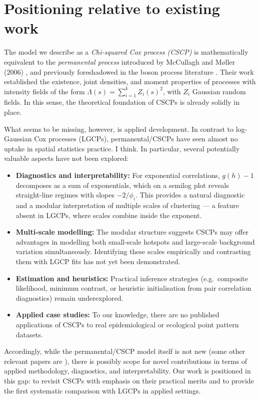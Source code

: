\documentclass[11pt]{article}
\begin{document}
\section*{Positioning relative to existing work}

The model we describe as a \emph{Chi-squared Cox process (CSCP)} is mathematically 
equivalent to the \emph{permanental process} introduced by McCullagh and M{\o}ller (2006) \cite{McCullaghMoller2006}, 
and previously foreshadowed in the boson process literature 
\cite{ShiraiTakahashi2003,ShiraiTakahashi2004}. 
Their work established the existence, joint densities, and moment properties of 
processes with intensity fields of the form 
$\Lambda(s)=\sum_{i=1}^k Z_i(s)^2$, 
with $Z_i$ Gaussian random fields. In this sense, the theoretical foundation of CSCPs 
is already solidly in place.

What seems to be missing, however, is applied development. 
In contrast to log-Gaussian Cox processes (LGCPs), 
permanental/CSCPs have seen almost no uptake in 
spatial statistics practice. I think.
In particular, several potentially valuable aspects have not been explored:
\begin{itemize}
	\item \textbf{Diagnostics and interpretability:} 
	For exponential correlations, $g(h)-1$ decomposes as a sum of exponentials, 
	which on a semilog plot reveals straight-line regimes with slopes $-2/\phi_i$. 
	This provides a natural diagnostic and a modular interpretation of multiple scales of clustering --- a feature absent in LGCPs, where scales combine inside the exponent.
	\item \textbf{Multi-scale modelling:} 
	The modular structure suggests CSCPs may offer advantages in modelling 
	both small-scale hotspots and large-scale background variation simultaneously. 
	Identifying these scales empirically and contrasting them with LGCP fits 
	has not yet been demonstrated.
	\item \textbf{Estimation and heuristics:} 
	Practical inference strategies (e.g.\ composite likelihood, minimum contrast, 
	or heuristic initialisation from pair correlation diagnostics) remain underexplored.
	\item \textbf{Applied case studies:} 
	To our knowledge, there are no published applications of CSCPs to real 
	epidemiological or ecological point pattern datasets. 
\end{itemize}

Accordingly, while the permanental/CSCP model itself is not new (some other relevant papers are \cite{WalderBishopICML2017,WalderBishopMCAP2017,Nicolis2022,Eisenbaum2008}), 
there is possibly scope for novel contributions in terms of 
applied methodology, diagnostics, and interpretability. 
Our work is positioned in this gap: to revisit CSCPs with emphasis on their 
practical merits and to provide the first systematic comparison with LGCPs in applied settings.
\end{document}
